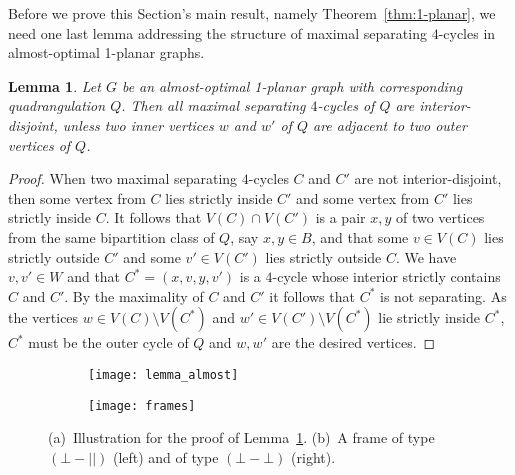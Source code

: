 \documentclass{article}
\newtheorem{lemma}[theorem]{Lemma}
\newcommand{\pperp}{\ensuremath{(\bot{-}\bot)}}
\newcommand{\ppar}{\ensuremath{(\bot{-}||)}}
\begin{document}
Before we prove this Section's main result, namely Theorem~\ref{thm:1-planar}, we need one last lemma addressing the structure of maximal separating $4$-cycles in almost-optimal 1-planar graphs.


\begin{lemma}\label{lem:almost}
 Let $G$ be an almost-optimal 1-planar graph with corresponding quadrangulation $Q$.
 Then all maximal separating $4$-cycles of $Q$ are interior-disjoint, unless two inner vertices $w$ and $w'$ of $Q$ are adjacent to two outer vertices of $Q$.
\end{lemma}
\begin{proof}
 When two maximal separating $4$-cycles $C$ and $C'$ are not interior-disjoint, then some vertex from $C$ lies strictly inside $C'$ and some vertex from $C'$ lies strictly inside $C$.
 It follows that $V(C) \cap V(C')$ is a pair $x,y$ of two vertices from the same bipartition class of $Q$, say $x,y \in B$, and that some $v \in V(C)$ lies strictly outside $C'$ and some $v' \in V(C')$ lies strictly outside $C$.
 We have $v,v' \in W$ and that $C^* = (x,v,y,v')$ is a $4$-cycle whose interior strictly contains $C$ and $C'$.
 By the maximality of $C$ and $C'$ it follows that $C^*$ is not separating.
 As the vertices $w \in V(C) \setminus V(C^*)$ and $w' \in V(C') \setminus V(C^*)$ lie strictly inside $C^*$, $C^*$ must be the outer cycle of $Q$ and $w,w'$ are the desired vertices.
\end{proof}

\begin{figure}[t]
\centering
  \begin{subfigure}[t]{.2\textwidth}
    \centering
    \texttt{[image: lemma\_almost]}
    \caption{}
    \label{fig:sep-pair-b}
  \end{subfigure}
  \hspace{3em}
  \begin{subfigure}[t]{.5\textwidth}
    \centering
    \texttt{[image: frames]}
    \caption{}
    \label{fig:frames}
  \end{subfigure}
  \caption{(a)~Illustration for the proof of Lemma~\ref{lem:almost}.
  (b)~A frame of type $\ppar$ (left) and of type $\pperp$ (right).}
\end{figure}
\end{document}
